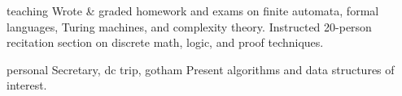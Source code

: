\documentclass{cv}
\begin{document}
\begin{entrylist}{teaching}
    {Wrote \& graded homework and exams on finite automata, formal languages, Turing machines, and complexity theory.}
    {Instructed 20-person recitation section on discrete math, logic, and proof techniques.}
\end{entrylist}

\begin{entrylist}{personal}
  {Secretary, dc trip, gotham
  }
  {Present algorithms and data structures of interest.
  } 
\end{entrylist}
\end{document}
